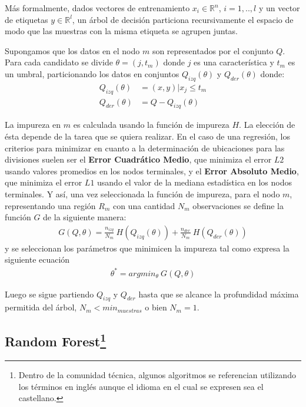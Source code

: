     \par Más formalmente, dados vectores de entrenamiento $x_{i} \in \mathbb{R}^{n}$, $i = 1,..,l$
      y un vector de etiquetas $y \in \mathbb{R}^{l}$, un árbol de decisión particiona
      recursivamente el espacio de modo que las muestras con la misma etiqueta se agrupen juntas.


    \par Supongamos que los datos en el nodo $m$ son representados por el conjunto $Q$. Para cada
      candidato se divide $\theta = (j, t_{m})$ donde $j$ es una característica y
      $t_{m}$ es un umbral, particionando los datos en conjuntos $Q_{izq}(\theta)$ y
      $Q_{der}(\theta)$ donde:
      \begin{align}
        Q_{izq}(\theta) &= (x, y) | x_{j} \leq t_m \\
        Q_{der}(\theta) &= Q - Q_{izq}(\theta)
      \end{align}


      La impureza en $m$ es calculada usando la función de impureza $H$. La elección
      de ésta depende de la tarea que se quiera realizar.
      En el caso de una regresión, los criterios
      para minimizar en cuanto a la determinación de ubicaciones para las divisiones
      suelen ser el \textbf{Error Cuadrático Medio}, que minimiza el error $L2$\cite{l2_l1_reg} usando
      valores promedios en los nodos terminales, y el \textbf{Error Absoluto Medio}, que minimiza
      el error $L1$\cite{l2_l1_reg} usando el valor de la mediana estadística en los nodos terminales.
      Y así, una vez seleccionada la función de impureza, para el nodo $m$, representando una región $R_{m}$ con una cantidad $N_{m}$ observaciones
      se define la función $G$ de la siguiente manera:
      \begin{align}
        G(Q, \theta) = \frac{n_{izq}}{N_{m}} \ H(Q_{izq}(\theta)) + \frac{n_{der}}{N_{m}} \ H(Q_{der}(\theta))
      \end{align}
      y se seleccionan los parámetros que minimicen la impureza tal como expresa la
      siguiente ecuación
      \begin{align}
        \theta^{*} = argmin_{\theta} \ G(Q, \theta)
      \end{align}

      Luego se sigue partiendo $Q_{izq}$ y $Q_{der}$ hasta que se alcance la profundidad
      máxima permitida del árbol, $N_{m} < min_{muestras}$ o bien $N_{m} = 1$.


  \subsection[Random Forest]{Random Forest\footnote{Dentro de la comunidad técnica, algunos
  algoritmos se referencian utilizando los términos en inglés
  aunque el idioma en el cual se expresen sea el castellano.}}

